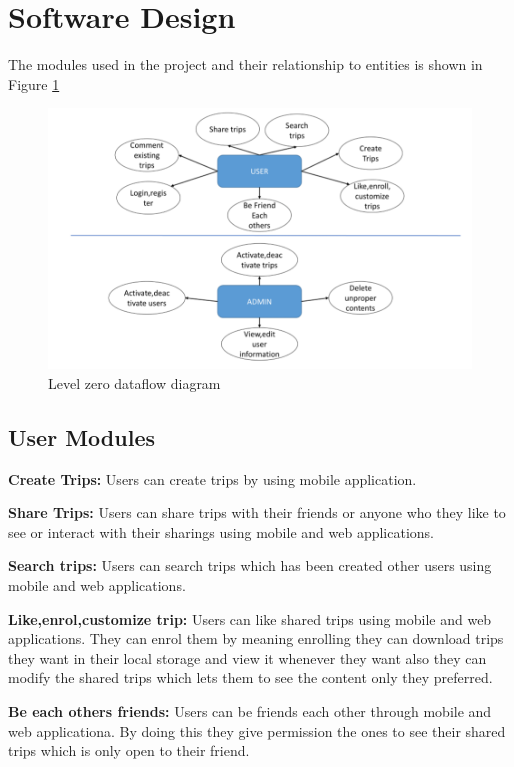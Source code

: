 \newpage
\section{Software Design}

The modules used in the project and their relationship to entities is shown in Figure \ref{fig:eR}
\begin{figure}[!ht]
\centering
\includegraphics[scale=0.6]{projectChapters/images/ER.png}
\caption{Level zero dataflow diagram }
\label{fig:eR}
\end{figure}


\subsection{User Modules}
\textbf{Create Trips:} Users can create trips by using mobile application.

\textbf{Share Trips:} Users can share trips with their friends or anyone who they like to see or interact with their sharings using mobile and web applications. 

\textbf{Search trips:} Users can search trips which has been created other users using mobile and web applications.


\textbf{Like,enrol,customize trip:} Users can like shared trips using mobile and web applications. They can enrol them by meaning enrolling they can download trips they want in their local storage and view it whenever they want also they can modify the shared trips which lets them to see the content only they preferred.

\textbf{Be each others friends:} Users can be friends each other through mobile and web applicationa. By doing this they give permission the ones to see their shared trips which is only open to their friend.

